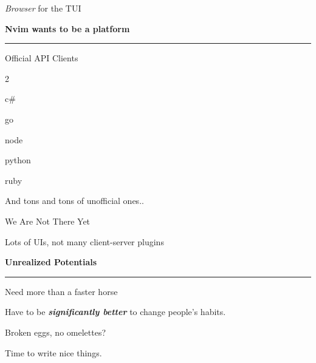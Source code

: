 \documentclass{beamer}
\begin{document}
\begin{frame}{\textit{Browser} for the TUI}

	\textbf{Nvim wants to be a platform}

	\rule{\textwidth}{0.1em}

	\hspace{0.1em}

	\begin{block}{Official API Clients}

		\begin{itemize}


		\end{itemize}

	\end{block}

	And tons and tons of unofficial ones..

\end{frame}


\begin{frame}{We Are Not There Yet}

	Lots of UIs, not many client-server plugins

	\textbf{Unrealized Potentials}

	\rule{\textwidth}{0.1em}

	Need more than a faster horse

	\hspace{0.1em}

	Have to be \textbf{\textit{significantly better}} to change people's habits.

\end{frame}


\begin{frame}[standout]

	Broken eggs, no omelettes?

	Time to write nice things.

\end{frame}
\end{document}

